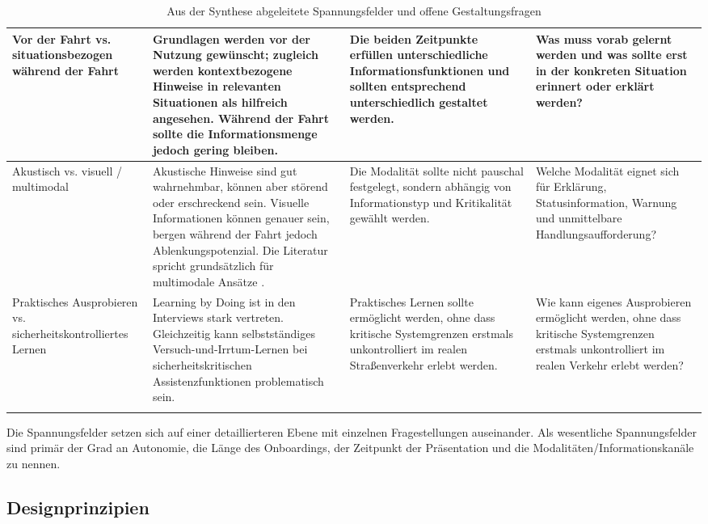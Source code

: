 {\begin{xltabular}{\textwidth}{
    |P{0.18\textwidth}
    |P{0.26\textwidth}
    |P{0.24\textwidth}
    |Y|
}
Vor der Fahrt vs. situationsbezogen während der Fahrt &
Grundlagen werden vor der Nutzung gewünscht; zugleich werden kontextbezogene
Hinweise in relevanten Situationen als hilfreich angesehen. Während der Fahrt
sollte die Informationsmenge jedoch gering bleiben. &
Die beiden Zeitpunkte erfüllen unterschiedliche Informationsfunktionen und
sollten entsprechend unterschiedlich gestaltet werden. &
Was muss vorab gelernt werden und was sollte erst in der konkreten Situation
erinnert oder erklärt werden?
\\
\hline

Akustisch vs. visuell / multimodal &
Akustische Hinweise sind gut wahrnehmbar, können aber störend oder
erschreckend sein. Visuelle Informationen können genauer sein, bergen während
der Fahrt jedoch Ablenkungspotenzial. Die Literatur spricht grundsätzlich für
multimodale Ansätze \cite{detjen2021supporting}. &
Die Modalität sollte nicht pauschal festgelegt, sondern abhängig von
Informationstyp und Kritikalität gewählt werden. &
Welche Modalität eignet sich für Erklärung, Statusinformation, Warnung und
unmittelbare Handlungsaufforderung?
\\
\hline

Praktisches Ausprobieren vs. sicherheitskontrolliertes Lernen &
Learning by Doing ist in den Interviews stark vertreten. Gleichzeitig kann
selbstständiges Versuch-und-Irrtum-Lernen bei sicherheitskritischen
Assistenzfunktionen problematisch sein. &
Praktisches Lernen sollte ermöglicht werden, ohne dass kritische Systemgrenzen
erstmals unkontrolliert im realen Straßenverkehr erlebt werden. &
Wie kann eigenes Ausprobieren ermöglicht werden, ohne dass kritische
Systemgrenzen erstmals unkontrolliert im realen Verkehr erlebt werden?
\\
\hline

\caption{Aus der Synthese abgeleitete Spannungsfelder und offene Gestaltungsfragen}
\label{tab:spannungsfelder}
\\

\end{xltabular}
}

Die Spannungsfelder setzen sich auf einer detaillierteren Ebene mit einzelnen Fragestellungen auseinander. Als wesentliche Spannungsfelder sind primär der Grad an Autonomie, die Länge des Onboardings, der Zeitpunkt der Präsentation und die Modalitäten/Informationskanäle zu nennen.

\subsection{Designprinzipien}
\label{subsec:Ergebnisse_Designprinzipien}

